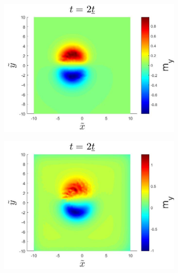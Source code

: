 \begin{figure}[h!]
\begin{subfigure}{.45\textwidth}
  \centering
  \includegraphics[width=\linewidth]{Figures/SkyrmionMyRSOCR0.jpg}
  \caption{}
\end{subfigure}
\begin{subfigure}{.45\textwidth}
  \centering
  \includegraphics[width=\linewidth]{Figures/SkyrmionMyRSOC.jpg}
  \caption{}
\end{subfigure}


\end{figure}

